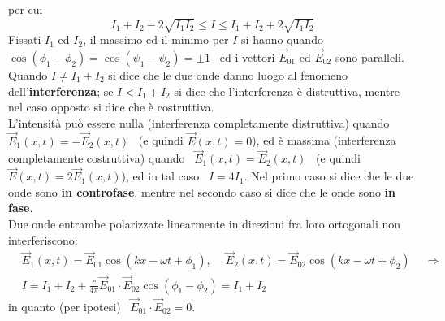 per cui
\begin{equation}
  I_1+I_2-2\sqrt{I_1I_2}\le I\le I_1+I_2+2\sqrt{I_1I_2}
  \tag{13.5}
\end{equation}
Fissati $I_1$ ed $I_2$, il massimo ed il minimo per $I$ si hanno quando
\ $\cos(\phi_1-\phi_2)=\cos(\psi_1-\psi_2)=\pm1$ \ ed i vettori $\vec E_{01}$ ed
$\vec E_{02}$ sono paralleli. Quando $I\ne I_1+I_2$ si dice che le due onde
danno luogo al fenomeno dell'\textbf{interferenza}; se $I<I_1+I_2$ si dice che
l'interferenza \`e distruttiva, mentre nel caso opposto si dice che \`e
costruttiva.\\
L'intensit\`a pu\`o essere nulla (interferenza completamente distruttiva) quando
\ $\vec E_1(x,t)=-\vec E_2(x,t)$ \ (e quindi $\vec E(x,t)=0$), ed \`e massima
(interferenza completamente costruttiva) quando \ $\vec E_1(x,t)=\vec E_2(x,t)$
\ \big(e quindi $\vec E(x,t)=2\vec E_1(x,t)$\big), ed in tal caso \ $I=4I_1$.
Nel primo caso si dice che le due onde sono \textbf{in controfase}, mentre nel
secondo caso si dice che le onde sono \textbf{in fase}.\\
Due onde entrambe polarizzate linearmente in direzioni fra loro ortogonali non
interferiscono:
\begin{equation}
  \begin{aligned}
    &\vec E_1(x,t)=\vec E_{01}\cos(kx-\omega t+\phi_1),
    \quad\ \vec E_2(x,t)=\vec E_{02}\cos(kx-\omega t+\phi_2)\quad\ \Rightarrow\\
    &I=I_1+I_2+\frac{c}{4\pi}\vec E_{01}\cdot\vec E_{02}\cos(\phi_1-\phi_2)
    =I_1+I_2
  \end{aligned}
  \tag{13.6}
\end{equation}
in quanto (per ipotesi) \ $\vec E_{01}\cdot\vec E_{02}=0$.

